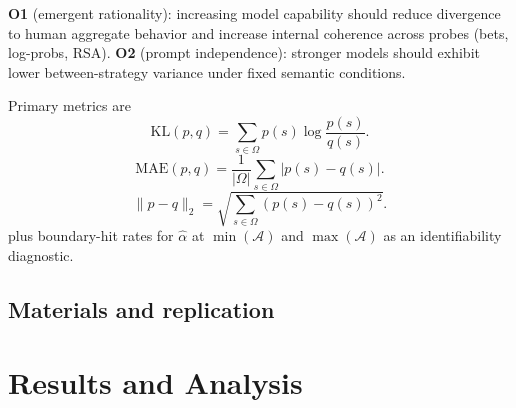 \documentclass[11pt]{article}
\begin{document}
{\textbf{O1} (emergent rationality): increasing model capability should reduce divergence to human aggregate behavior and increase internal coherence across probes (bets, log-probs, RSA). \textbf{O2} (prompt independence): stronger models should exhibit lower between-strategy variance under fixed semantic conditions.

Primary metrics are
\begin{equation}
\mathrm{KL}(p,q)=\sum_{s\in\Omega}p(s)\log\frac{p(s)}{q(s)}.
\end{equation}
\begin{equation}
\mathrm{MAE}(p,q)=\frac{1}{|\Omega|}\sum_{s\in\Omega}|p(s)-q(s)|.
\end{equation}
\begin{equation}
\|p-q\|_2=\sqrt{\sum_{s\in\Omega}(p(s)-q(s))^2}.
\end{equation}
plus boundary-hit rates for $\hat\alpha$ at $\min(\mathcal{A})$ and $\max(\mathcal{A})$ as an identifiability diagnostic.



\subsection{Materials and replication}

\noindent\begingroup

\setlength{\fboxsep}{5pt}\setlength{\fboxrule}{0.6pt}

\endgroup



\section{Results and Analysis}

}
\end{document}
